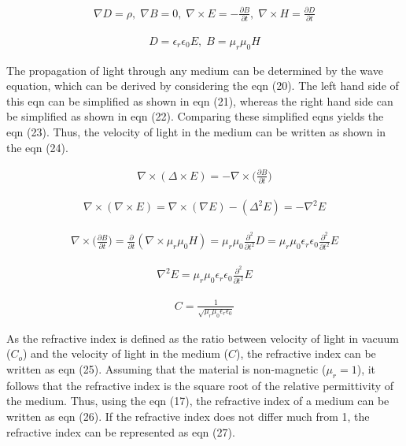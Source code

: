 \begin{align}
\nabla D = \rho,\; \nabla B = 0,\; \nabla \times E = - \frac{\partial B}{\partial t},\; 
\nabla \times H = \frac{\partial D}{\partial t}
\end{align}

\begin{align}
D = \epsilon_r \epsilon_0 E,\; B = \mu_r \mu_0 H
\end{align}

The propagation of light through any medium can be determined by the wave equation, which can be derived by considering the eqn (20). The left hand side of this eqn can be simplified as shown in eqn (21), whereas the right hand side can be simplified as shown in eqn (22). Comparing these simplified eqns yields the eqn (23). Thus, the velocity of light in the medium can be written as shown in the eqn (24). 

\begin{align}
\nabla \times (\Delta \times E) = - \nabla \times \bigg(\frac{\partial B}{\partial t}\bigg)
\end{align}

\begin{align}
\nabla \times (\nabla \times E) = \nabla \times (\nabla E) -(\Delta^2E) = - \nabla^2E \end{align}

\begin{align}
\nabla \times \big(\frac{\partial B}{\partial t}\big) = 
\frac{\partial}{\partial t}(\nabla \times \mu_r \mu_0 H)= \mu_r \mu_0 \frac{\partial^2}{\partial t^2}D = \mu_r \mu_0 \epsilon_r \epsilon_0 \frac{\partial^2}{\partial t^2}E
\end{align}

\begin{align}
\nabla^2 E = \mu_r \mu_0 \epsilon_r \epsilon_0 \frac{\partial^2}{\partial t^2}E
\end{align}

\begin{align}
C = \frac{1}{\sqrt{\mu_r \mu_0 \epsilon_r \epsilon_0 }}
\end{align}

As the refractive index is defined as the ratio between velocity of light in vacuum ($C_o$) and the velocity of light in the medium ($C$), the refractive index can be written as eqn (25). Assuming that the material is non-magnetic ($\mu_r=1$), it follows that the refractive index is the square root of the relative permittivity of the medium. Thus, using the eqn (17), the refractive index of a medium can be written as eqn (26). If the refractive index does not differ much from 1, the refractive index can be represented as eqn (27).


